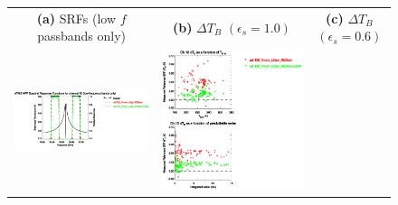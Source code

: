 \begin{figure}[H]
  \centering
  \begin{tabular}{c c c}
    \textsf{\textbf{(a)} SRFs (low $f$ passbands only)} &
    \textsf{\textbf{(b)} $\Delta T_B$ $(\epsilon_s = 1.0)$} &
    \textsf{\textbf{(c)} $\Delta T_B$ $(\epsilon_s = 0.6)$} \\
    \includegraphics[bb=80 400 280 558,clip,scale=0.85]{graphics/srf/Rset/atms_npp.ch13.osrf.eps} &
    \includegraphics[bb=85 400 260 558,clip,scale=0.85]{graphics/dtb/Rset/e1.0_r0.0/atms_npp.ch13.dTb.eps} & 

\end{tabular}
\end{figure}
